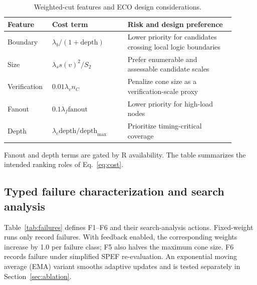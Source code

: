\documentclass[preprint,12pt]{elsarticle}
\begin{document}
\begin{table}[htbp]\centering\small
\caption{Weighted-cut features and ECO design considerations.}\label{tab:feature_motivation}
\begin{tabular}{p{0.15\linewidth}p{0.31\linewidth}p{0.44\linewidth}}\toprule
Feature & Cost term & Risk and design preference\\\midrule
Boundary & $\lambda_b/(1+\mathrm{depth})$ & Lower priority for candidates crossing local logic boundaries\\
Size & $\lambda_s s(v)^2/S_2$ & Prefer enumerable and assessable candidate scales\\
Verification & $0.01\lambda_v n_C$ & Penalize cone size as a verification-scale proxy\\
Fanout & $0.1\lambda_f\mathrm{fanout}$ & Lower priority for high-load nodes\\
Depth & $\lambda_c\mathrm{depth}/\mathrm{depth}_{\max}$ & Prioritize timing-critical coverage\\\bottomrule
\end{tabular}
\par\smallskip\footnotesize Fanout and depth terms are gated by R availability. The table summarizes the intended ranking roles of Eq.~\eqref{eq:cost}.
\end{table}

\subsection{Typed failure characterization and search analysis}\label{sec:failure_char}
Table~\ref{tab:failures} defines F1--F6 and their search-analysis actions. Fixed-weight runs only record failures. With feedback enabled, the corresponding weights increase by 1.0 per failure class; F5 also halves the maximum cone size. F6 records failure under simplified SPEF re-evaluation. An exponential moving average (EMA) variant smooths adaptive updates and is tested separately in Section~\ref{sec:ablation}.
\end{document}
